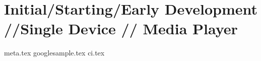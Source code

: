 \chapter{Initial/Starting/Early Development //Single Device // Media Player}
{meta.tex}
{googlesample.tex}
{ci.tex}
